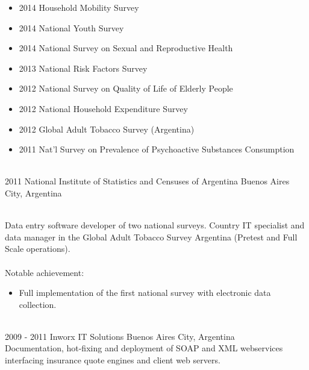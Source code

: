 \documentclass[]{cv-style}          %
\begin{document}
\begin{entrylist}
{\begin{itemize}
  	\item 2014 Household Mobility Survey
    \item 2014 National Youth Survey
    \item 2014 National Survey on Sexual and Reproductive Health
    \item 2013 National Risk Factors Survey
    \item 2012 National Survey on Quality of Life of Elderly People
    \item 2012 National Household Expenditure Survey
    \item 2012 Global Adult Tobacco Survey (Argentina)
    \item 2011 Nat'l Survey on Prevalence of Psychoactive Substances Consumption 
  \end{itemize}
}\\
\entry
  {2011}
  {National Institute of Statistics and Censuses of Argentina}
  {Buenos Aires City, Argentina}
  {\\
  Data entry software developer of two national surveys. Country IT specialist 
  and data manager in the Global Adult Tobacco Survey Argentina (Pretest and Full 
  Scale operations). \\\
  \\
  Notable achievement:
  \begin{itemize}
    \item Full implementation of the first national survey with electronic data collection.
  \end{itemize}
}\\
\entry
  {2009 - 2011}
  {Inworx IT Solutions}
  {Buenos Aires City, Argentina}
  {\\
  Documentation, hot-fixing and deployment of SOAP and XML webservices interfacing 
  insurance quote engines and client web servers.
  }\\
\end{entrylist}
\end{document}
